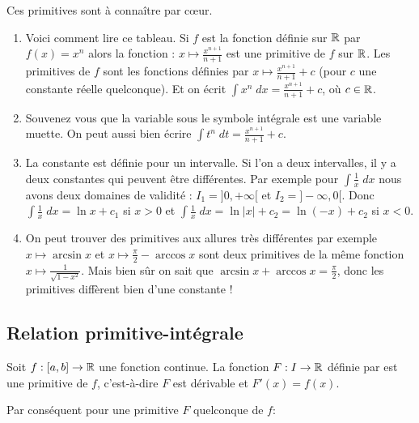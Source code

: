 \documentclass[class=report,crop=false]{standalone}
\begin{document}
\begin{remarque*}
Ces primitives sont à connaître par c\oe ur.
\begin{enumerate}
  \item  Voici comment lire ce tableau. Si $f$ est la fonction définie sur $\mathbb{R}$ par $f(x)=x^n$
alors la fonction : $x \mapsto \frac{x^{n+1}}{n+1}$ est une primitive de $f$ sur $\mathbb{R}$. Les primitives
de $f$ sont les fonctions définies par $x \mapsto \frac{x^{n+1}}{n+1}+c$ (pour $c$ une constante réelle quelconque).
Et on écrit $\int x^n \; dx=\frac{x^{n+1}}{n+1}+c$, où $c\in \mathbb{R}$.

  \item Souvenez vous que la variable sous le symbole intégrale est une variable muette. On peut aussi bien écrire
$\int t^n \; dt = \frac{x^{n+1}}{n+1}+c$.

  \item La constante est définie pour un intervalle. Si l'on a deux intervalles, il y a
deux constantes qui peuvent être différentes. Par exemple pour $\int \frac 1x \; dx$ nous avons deux domaines de validité :
$I_1=]0,+\infty[$ et $I_2=]-\infty,0[$. Donc
$\int \frac{1}{x} \; dx=\ln x +c_1$ si $x>0$ et $\int \frac{1}{x} \; dx=\ln |x| +c_2 =\ln (-x)+c_2$ si $x<0$.

  \item On peut trouver des primitives aux allures très différentes par exemple $x\mapsto \arcsin x$ et
$x\mapsto \frac{\pi}{2}-\arccos x$ sont deux primitives de la même fonction $x\mapsto \frac{1}{\sqrt{1-x^2}}$.
Mais bien sûr on sait que $\arcsin x + \arccos x = \frac\pi2$, donc les primitives diffèrent bien d'une constante !
\end{enumerate}
\end{remarque*}

\subsection{Relation primitive-intégrale}

\begin{theoreme}
Soit $f : [a,b] \to \mathbb{R}$ une fonction continue.
La fonction $F:I \to \mathbb{R}$ définie par
est une primitive de $f$, c'est-à-dire $F$ est dérivable et $F'(x)=f(x)$.

Par conséquent pour une primitive $F$ quelconque de $f$:
\end{theoreme}
\end{document}
